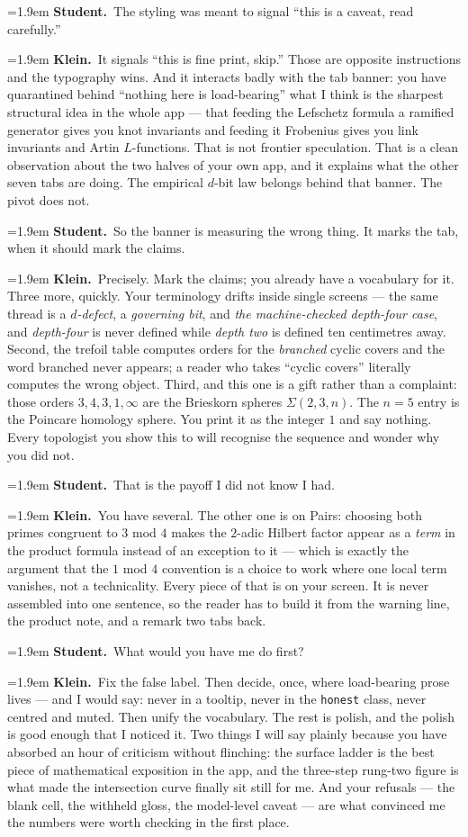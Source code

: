 \documentclass[11pt]{article}
\newcommand{\Stu}[1]{\par\smallskip\noindent\hangindent=1.9em\hangafter=1%
  \textcolor{stucol}{\textbf{Student.}}~#1\par}
\newcommand{\Kle}[1]{\par\smallskip\noindent\hangindent=1.9em\hangafter=1%
  \textcolor{klecol}{\textbf{Klein.}}~#1\par}
\begin{document}
\Stu{The styling was meant to signal ``this is a caveat, read carefully.''}

\Kle{It signals ``this is fine print, skip.'' Those are opposite instructions and the typography wins. And it interacts badly with the tab banner: you have quarantined behind ``nothing here is load-bearing'' what I think is the sharpest structural idea in the whole app --- that feeding the Lefschetz formula a ramified generator gives you knot invariants and feeding it Frobenius gives you link invariants and Artin $L$-functions. That is not frontier speculation. That is a clean observation about the two halves of your own app, and it explains what the other seven tabs are doing. The empirical $d$-bit law belongs behind that banner. The pivot does not.}

\Stu{So the banner is measuring the wrong thing. It marks the tab, when it should mark the claims.}

\Kle{Precisely. Mark the claims; you already have a vocabulary for it. Three more, quickly. Your terminology drifts inside single screens --- the same thread is a \emph{$d$-defect}, a \emph{governing bit}, and \emph{the machine-checked depth-four case}, and \emph{depth-four} is never defined while \emph{depth two} is defined ten centimetres away. Second, the trefoil table computes orders for the \emph{branched} cyclic covers and the word branched never appears; a reader who takes ``cyclic covers'' literally computes the wrong object. Third, and this one is a gift rather than a complaint: those orders $3, 4, 3, 1, \infty$ are the Brieskorn spheres $\Sigma(2,3,n)$. The $n = 5$ entry is the Poincare homology sphere. You print it as the integer $1$ and say nothing. Every topologist you show this to will recognise the sequence and wonder why you did not.}

\Stu{That is the payoff I did not know I had.}

\Kle{You have several. The other one is on Pairs: choosing both primes congruent to $3$ mod $4$ makes the $2$-adic Hilbert factor appear as a \emph{term} in the product formula instead of an exception to it --- which is exactly the argument that the $1$ mod $4$ convention is a choice to work where one local term vanishes, not a technicality. Every piece of that is on your screen. It is never assembled into one sentence, so the reader has to build it from the warning line, the product note, and a remark two tabs back.}

\Stu{What would you have me do first?}

\Kle{Fix the false label. Then decide, once, where load-bearing prose lives --- and I would say: never in a tooltip, never in the \texttt{honest} class, never centred and muted. Then unify the vocabulary. The rest is polish, and the polish is good enough that I noticed it. Two things I will say plainly because you have absorbed an hour of criticism without flinching: the surface ladder is the best piece of mathematical exposition in the app, and the three-step rung-two figure is what made the intersection curve finally sit still for me. And your refusals --- the blank cell, the withheld gloss, the model-level caveat --- are what convinced me the numbers were worth checking in the first place.}
\end{document}
